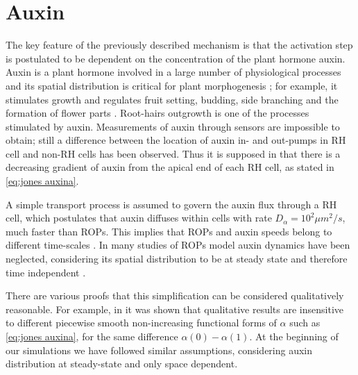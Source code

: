 \section{Auxin}
The key feature of the previously described mechanism is that the activation step is postulated to be dependent on the concentration of the plant hormone auxin. Auxin is a plant hormone involved in a large number of physiological processes and its spatial distribution is critical for plant morphogenesis \cite{vero:auxintrasnport, farcot:14, plant:Mironova}; for example, it stimulates growth and regulates fruit setting, budding, side branching and the formation of flower parts \cite{Vero:31_auxinpolarity, vero:auxintrasnport}. Root-hairs outgrowth is one of the processes stimulated by auxin. Measurements of auxin through sensors are impossible to obtain; still a difference between the location of auxin in- and out-pumps in RH cell and non-RH cells has been observed. Thus it is supposed in \cite{jones} that there is a decreasing gradient of auxin from the apical end of each RH cell, as stated in \eqref{eq:jones auxina}.

A simple transport process is assumed to govern the auxin flux through a RH cell, which postulates that auxin diffuses within cells with rate $D_{\alpha} = 10^2 \mu m^2/s$, much faster than ROPs. This implies that ROPs and auxin speeds belong to different time-scales \cite{plant:Alim}. In many studies of ROPs model auxin dynamics have been neglected, considering its spatial distribution to be at steady state and therefore time independent \cite{intra2, intra1_R, intra:Krup}.

There are various proofs that this simplification can be considered qualitatively reasonable. For example, in \cite{phdthesis:victor} it was shown that qualitative results are insensitive to different piecewise smooth non-increasing functional forms of $\alpha $ such as \eqref{eq:jones auxina}, for the same difference $\alpha(0) - \alpha(1)$. At the beginning of our simulations we have followed similar assumptions, considering auxin distribution at steady-state and only space dependent.

